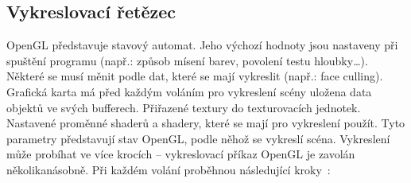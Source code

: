 \documentclass[thesis=M,czech]{FITthesis}[2019/12/23]
\begin{document}
\subsection{Vykreslovací řetězec}
OpenGL představuje stavový automat. Jeho výchozí hodnoty jsou nastaveny při spuštění programu (např.: způsob mísení barev, povolení testu hloubky\dots). Některé se musí měnit podle dat, které se mají vykreslit (např.: face culling). Grafická karta má před každým voláním pro vykreslení scény uložena data objektů ve svých bufferech. Přiřazené textury do texturovacích jednotek. Nastavené proměnné shaderů a shadery, které se mají pro vykreslení použít. Tyto parametry představují stav OpenGL, podle něhož se vykreslí scéna. Vykreslení může probíhat ve více krocích -- vykreslovací příkaz OpenGL je zavolán několikanásobně. Při každém volání proběhnou následující kroky~\cite{kronos_render}:
\end{document}
